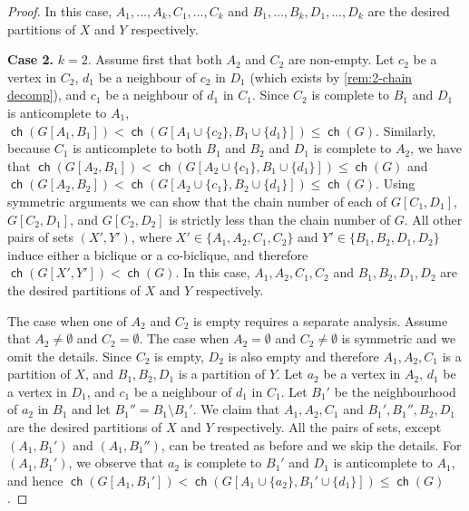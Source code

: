 \documentclass{theoretics}
\DeclareMathOperator\ch{\mathsf{ch}}
\begin{document}
\begin{proof}
	In this case, $A_1, \ldots, A_k, C_1, \ldots, C_k$ and $B_1, \ldots, B_k, D_1, \ldots, D_k$ are the desired partitions of $X$ and $Y$ respectively.
	
	
	\textbf{Case 2.} $k = 2$. Assume first that both $A_2$ and $C_2$ are non-empty.
	Let $c_2$ be a vertex in $C_2$, $d_1$ be a neighbour of $c_2$ in $D_1$ (which exists by \cref{rem:2-chain decomp}), and $c_1$
	be a neighbour of $d_1$ in $C_1$. Since $C_2$ is complete to $B_1$ and $D_1$ is
	anticomplete to $A_1$, $\ch(G[A_1,B_1]) < \ch(G[A_1 \cup \{ c_2 \}, B_1 \cup \{d_1\}]) \leq \ch(G)$.
	Similarly, because $C_1$ is anticomplete to both $B_1$ and $B_2$ and $D_1$ is complete to $A_2$,
	we have that $\ch(G[A_2,B_1]) < \ch(G[A_2 \cup \{ c_1 \}, B_1 \cup \{d_1\}]) \leq \ch(G)$
	and $\ch(G[A_2,B_2]) < \ch(G[A_2 \cup \{ c_1 \}, B_2 \cup \{d_1\}]) \leq \ch(G)$.
	Using symmetric arguments we can show that the chain number of each of 
	$G[C_1,D_1]$, $G[C_2,D_1]$, and $G[C_2,D_2]$ is strictly less than the chain number of
	$G$. All other pairs of sets $(X',Y')$, where $X' \in \{ A_1, A_2, C_1, C_2 \}$ and $Y' \in \{ B_1, B_2, D_1, D_2 \}$
	induce either a biclique or a co-biclique, and therefore $\ch(G[X',Y']) < \ch(G)$. In this case, $A_1, A_2, C_1, C_2$ and $B_1, B_2, D_1, D_2$ are the desired partitions of $X$ and $Y$ respectively.
	
	The case when one of $A_2$ and $C_2$ is empty requires a separate analysis. Assume that $A_2 \neq \emptyset$ 
	and $C_2 = \emptyset$. The  case when $A_2 = \emptyset$ and $C_2 \neq \emptyset$ is symmetric 
	and we omit the details.
	Since $C_2$ is empty, $D_2$ is also empty and therefore $A_1, A_2, C_1$ is a partition of $X$,
	and $B_1, B_2, D_1$ is a partition of $Y$. Let $a_2$ be a vertex in $A_2$, $d_1$ be a vertex in $D_1$,
	and $c_1$ be a neighbour of $d_1$ in $C_1$. Let $B_1'$ be the neighbourhood of $a_2$ in $B_1$ and
	let $B_1'' = B_1 \setminus B_1'$. We claim that  $A_1, A_2, C_1$ and $B_1', B_1'', B_2, D_1$
	are the desired partitions of $X$ and $Y$ respectively. 
	All the pairs of sets,
	except $(A_1, B_1')$ and $(A_1, B_1'')$, can be treated as before and we skip the details.
	For $(A_1, B_1')$, we observe that $a_2$ is complete to $B_1'$ and $D_1$ is anticomplete to $A_1$,
	and hence $\ch(G[A_1,B_1']) < \ch(G[A_1 \cup \{ a_2 \}, B_1' \cup \{d_1\}]) \leq \ch(G)$.
	

\end{proof}
\end{document}
